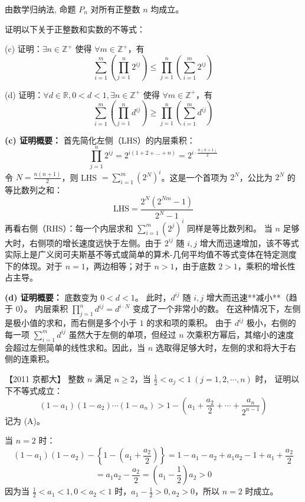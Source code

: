 \begin{questions}
\begin{solution}
        由数学归纳法, 命题 $P_n$ 对所有正整数 $n$ 均成立。
    \end{solution}

    \question
证明以下关于正整数和实数的不等式：

(c) 证明：$\exists n \in \mathbb{Z}^+$ 使得 $\forall m \in \mathbb{Z}^+$，有
\[
\sum_{i=1}^{m} \left( \prod_{j=1}^{n} 2^{ij} \right) \le \prod_{j=1}^{n} \left( \sum_{i=1}^{m} 2^{ij} \right)
\]

(d) 证明：$\forall d \in \mathbb{R}, 0 < d < 1, \exists n \in \mathbb{Z}^+$ 使得 $\forall m \in \mathbb{Z}^+$，有
\[
\sum_{i=1}^{m} \left( \prod_{j=1}^{n} d^{ij} \right) \ge \prod_{j=1}^{n} \left( \sum_{i=1}^{m} d^{ij} \right)
\]

\begin{solution}
\textbf{(c) 证明概要：}
首先简化左侧（LHS）的内层乘积：
\[
\prod_{j=1}^{n} 2^{ij} = 2^{i(1+2+\dots+n)} = 2^{i \cdot \frac{n(n+1)}{2}}
\]
令 $N = \frac{n(n+1)}{2}$，则 LHS $= \sum_{i=1}^{m} (2^N)^i$。这是一个首项为 $2^N$，公比为 $2^N$ 的等比数列之和：
\[
\text{LHS} = \frac{2^N(2^{Nm} - 1)}{2^N - 1}
\]
再看右侧（RHS）：每一个内层求和 $\sum_{i=1}^{m} (2^j)^i$ 同样是等比数列和。
当 $n$ 足够大时，右侧项的增长速度远快于左侧。由于 $2^{ij}$ 随 $i, j$ 增大而迅速增加，该不等式实际上是广义闵可夫斯基不等式或简单的算术-几何平均值不等式变体在特定测度下的体现。对于 $n=1$，两边相等；对于 $n > 1$，由于底数 $2 > 1$，乘积的增长性占主导。

\textbf{(d) 证明概要：}
底数变为 $0 < d < 1$。
此时，$d^{ij}$ 随 $i, j$ 增大而迅速**减小**（趋于 $0$）。
内层乘积 $\prod_{j=1}^{n} d^{ij} = d^{i \cdot N}$ 变成了一个非常小的数。
在这种情况下，左侧是极小值的求和，而右侧是多个小于 $1$ 的求和项的乘积。
由于 $d^{ij}$ 极小，右侧的每一项 $\sum_{i=1}^{m} d^{ij}$ 虽然大于左侧的单项，但经过 $n$ 次乘积方幂后，其缩小的速度会超过左侧简单的线性求和。因此，当 $n$ 选取得足够大时，左侧的求和将大于右侧的连乘积。
\end{solution}

\question
【2011 京都大】
整数 $n$ 满足 $n \ge 2$，当 $\frac{1}{2} < a_j < 1 \ (j = 1, 2, \cdots, n)$ 时，
证明以下不等式成立：
\[
(1-a_1)(1-a_2)\cdots(1-a_n) > 1 - \left(a_1 + \frac{a_2}{2} + \cdots + \frac{a_n}{2^{n-1}}\right)
\]
记为 (A)。

\begin{solution}
当 $n = 2$ 时：
\[
(1-a_1)(1-a_2) - \left\{ 1 - \left(a_1 + \frac{a_2}{2}\right) \right\} = 1 - a_1 - a_2 + a_1 a_2 - 1 + a_1 + \frac{a_2}{2}
\]
\[
= a_1 a_2 - \frac{a_2}{2} = \left(a_1 - \frac{1}{2}\right) a_2 > 0
\]
因为当 $\frac{1}{2} < a_1 < 1, 0 < a_2 < 1$ 时，$a_1 - \frac{1}{2} > 0, a_2 > 0$，所以 $n = 2$ 时成立。


\end{solution}
\end{questions}
